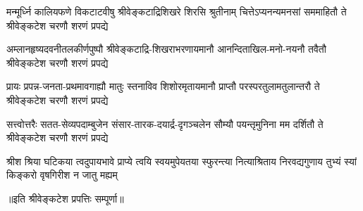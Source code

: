 \begin{AutoCols}[\maxColumns]
\fourlineindentedshloka
{मन्मूर्ध्नि कालियफणे विकटाटवीषु}
{श्रीवेङ्कटाद्रिशिखरे शिरसि श्रुतीनाम्}
{चित्तेऽप्यनन्यमनसां सममाहितौ ते}
{श्रीवेङ्कटेश चरणौ शरणं प्रपद्ये}

\fourlineindentedshloka
{अम्लानहृष्यदवनीतलकीर्णपुष्पौ}
{श्रीवेङ्कटाद्रि-शिखराभरणायमानौ}
{आनन्दिताखिल-मनो-नयनौ तवैतौ}
{श्रीवेङ्कटेश चरणौ शरणं प्रपद्ये}

\fourlineindentedshloka
{प्रायः प्रपन्न-जनता-प्रथमावगाह्यौ}
{मातुः स्तनाविव शिशोरमृतायमानौ}
{प्राप्तौ परस्परतुलामतुलान्तरौ ते}
{श्रीवेङ्कटेश चरणौ शरणं प्रपद्ये}

\fourlineindentedshloka
{सत्त्वोत्तरैः सतत-सेव्यपदाम्बुजेन}
{संसार-तारक-दयार्द्र-दृगञ्चलेन}
{सौम्यौ पयन्तृमुनिना मम दर्शितौ ते}
{श्रीवेङ्कटेश चरणौ शरणं प्रपद्ये}

\fourlineindentedshloka
{श्रीश श्रिया घटिकया त्वदुपायभावे}
{प्राप्ये त्वयि स्वयमुपेयतया स्फुरन्त्या}
{नित्याश्रिताय निरवद्यगुणाय तुभ्यं}
{स्यां किङ्करो वृषगिरीश न जातु मह्यम्}

॥इति श्रीवेङ्कटेश प्रपत्तिः सम्पूर्णा॥

\end{AutoCols}

